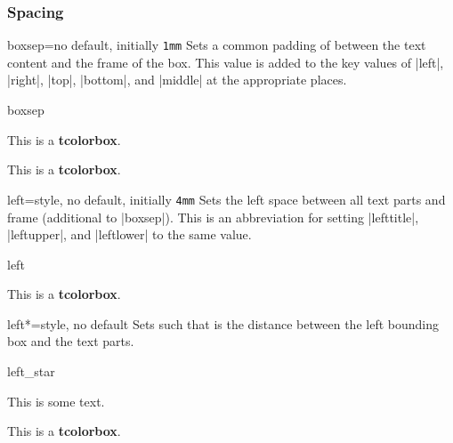 \clearpage
\subsubsection{Spacing}
\begin{docTcbKey}{boxsep}{=}{no default, initially \texttt{1mm}}
  Sets a common padding of  between the text content and the
  frame of the box. This value is added to the key values of
  |left|, |right|, |top|, |bottom|, and |middle| at the appropriate places.
\begin{exdispExample}{boxsep}

\begin{tcolorbox}[boxsep=5mm]
This is a \textbf{tcolorbox}.
\end{tcolorbox}
\begin{tcolorbox}[boxsep=5mm,draft]
This is a \textbf{tcolorbox}.
\end{tcolorbox}
\end{exdispExample}
\end{docTcbKey}


\begin{docTcbKey}{left}{=}{style, no default, initially \texttt{4mm}}
  Sets the left space between all text parts and frame (additional to |boxsep|).
  This is an abbreviation for setting
  |lefttitle|, |leftupper|, and |leftlower| to the same value.
\begin{exdispExample}{left}

\begin{tcolorbox}[left=0mm]
This is a \textbf{tcolorbox}.
\end{tcolorbox}
\end{exdispExample}
\end{docTcbKey}


\begin{docTcbKey}[][doc new=2017-02-16]{left*}{=}{style, no default}
  Sets  such that  is the distance between
  the left bounding box and the text parts.
\begin{exdispExample}{left_star}

This is some text.
\begin{tcolorbox}[grow to left by=5mm,left*=0mm,
  enhanced,show bounding box]
This is a \textbf{tcolorbox}.
\end{tcolorbox}
\end{exdispExample}
\end{docTcbKey}

